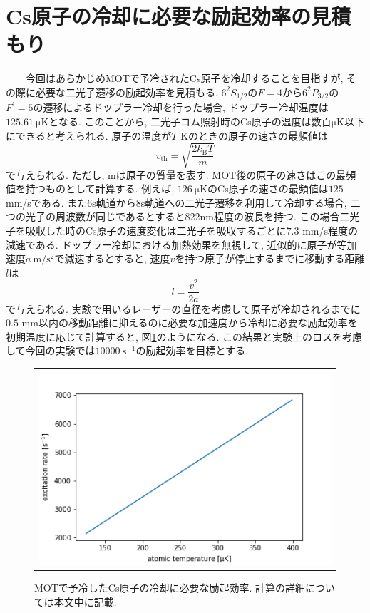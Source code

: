 \documentclass[uplatex, dvipdfmx, a4paper, report, papersize, 11pt]{jsbook}
\begin{document}
\section{Cs原子の冷却に必要な励起効率の見積もり}
　　今回はあらかじめMOTで予冷されたCs原子を冷却することを目指すが, その際に必要な二光子遷移の励起効率を見積もる. $6 ^ { 2 } S _ { 1 / 2 }$の$F = 4$から$6 ^ { 2 } P _ { 3 / 2 }$の$F ^ { \prime } = 5$の遷移によるドップラー冷却を行った場合, ドップラー冷却温度は$125.61\ \mathrm{\mu K}$となる\cite{Cs_level_diagram}. このことから, 二光子コム照射時のCs原子の温度は数百$\mathrm{\mu K}$以下にできると考えられる. 原子の温度が$T$ Kのときの原子の速さの最頻値は
\begin{equation}
  v _ { \mathrm { th } } = \sqrt { \frac { 2 k _ { \mathrm { B } } T } { m }}
\end{equation}
で与えられる. ただし, mは原子の質量を表す. MOT後の原子の速さはこの最頻値を持つものとして計算する. 例えば, $126\ \mathrm{\mu K}$のCs原子の速さの最頻値は$125$ mm/sである. また6s軌道から8s軌道への二光子遷移を利用して冷却する場合, 二つの光子の周波数が同じであるとすると822nm程度の波長を持つ. この場合二光子を吸収した時のCs原子の速度変化は二光子を吸収するごとに$7.3$ mm/s程度の減速である.
ドップラー冷却における加熱効果を無視して, 近似的に原子が等加速度$a\ \mathrm{m/s^2}$で減速するとすると, 速度$v$を持つ原子が停止するまでに移動する距離$l$は
\begin{equation}
    l = \frac{v^2}{2a}
\end{equation}
で与えられる. 実験で用いるレーザーの直径を考慮して原子が冷却されるまでに$0.5$ mm以内の移動距離に抑えるのに必要な加速度から冷却に必要な励起効率を初期温度に応じて計算すると, 図\ref{necessary_excitation_rate}のようになる. この結果と実験上のロスを考慮して今回の実験では$10000\ \mathrm{s^{-1}}$の励起効率を目標とする.
\begin{figure}[htpb]
  \centering
    \begin{tabular}{c}
      \begin{minipage}{1\hsize}
        \centering
          \includegraphics[keepaspectratio,  scale=0.6,  angle=0]
                          {figures/chapter3/necessary_excitation_rate.png}
                          \caption{MOTで予冷したCs原子の冷却に必要な励起効率. 計算の詳細については本文中に記載. }
                          \label{necessary_excitation_rate}

      \end{minipage}
    \end{tabular}
\end{figure}
\end{document}
